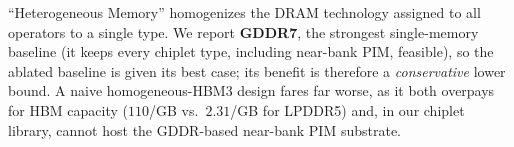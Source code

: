 \begin{table}[t]
\vspace{2pt}
{\footnotesize ``Heterogeneous Memory'' homogenizes the DRAM technology assigned to all operators
to a single type. We report \textbf{GDDR7}, the strongest single-memory baseline (it keeps every
chiplet type, including near-bank PIM, feasible), so the ablated baseline is given its best case;
its benefit is therefore a \emph{conservative} lower bound. A naive homogeneous-HBM3 design fares
far worse, as it both overpays for HBM capacity ($110$/GB vs.\ $2.31$/GB for LPDDR5) and, in our
chiplet library, cannot host the GDDR-based near-bank PIM substrate.}
\end{table}
